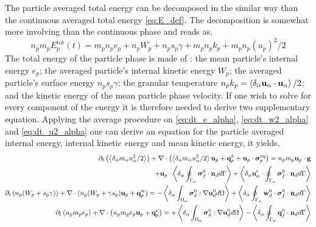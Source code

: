 The particle averaged total energy can be decomposed in the similar way than the continuous averaged total energy \ref{eq:E_def}. 
The decomposition is somewhat more involving than the continuous phase and reads as, 
\begin{equation*}
    n_p m_p E_p^\text{tot}(t) 
    = m_p n_p e_p 
    + n_p W_p
    + n_p s_p \gamma
    + m_p n_p k_p
    + m_p n_p (u_p)^2/2
    \label{eq:E_p_def}
\end{equation*}
The total energy of the particle phase is made of :
the mean particle's internal energy $e_p$; 
the averaged particle's internal kinetic energy $W_p$;
the averaged particle's surface energy $n_p s_p \gamma$;
the granular temperature $n_p k_p =\left<\delta_\alpha \textbf{u}_\alpha \cdot\textbf{u}_\alpha\right>/2$;
and the kinetic energy of the mean particle phase velocity. 
If one wish to solve for every component of the energy it is therefore needed to derive two supplementary equation. 
Applying the average procedure on \ref{eq:dt_e_alpha}, \ref{eq:dt_w2_alpha} and \ref{eq:dt_u2_alpha} one can derive an equation for the particle averaged internal energy, internal kinetic energy and mean kinetic energy, it yields, 
\begin{align}
    \label{eq:dt_hybrid_u2p}
    \partial_t \left(\left<\delta_\alpha m_\alpha u_\alpha^2/2\right>\right)
    + \mathbf{\nabla}\cdot \left(\left<\delta_\alpha m_\alpha u_\alpha^2/2\right> \textbf{u}_p 
    + \textbf{q}^k_p
    + \textbf{u}_p \cdot \bm{\sigma}_p^\text{eq}
    \right)
    = 
    n_p m_p \textbf{u}_p \cdot
    \textbf{g}\nonumber\\  
    + \textbf{u}_p\cdot\left<\delta_\alpha \oint_{\Gamma_\alpha} {\bm{\sigma}_f^0 \cdot \textbf{n}_d} d\Gamma\right>
    + \left<\delta_\alpha \textbf{u}_\alpha'\cdot\oint_{\Gamma_\alpha} \bm{\sigma}_f^0 \cdot \textbf{n}_d d\Gamma\right>
    \\
    \label{eq:dt_hybrid_Wp}
    \partial_t \left(n_p (W_p + s_p\gamma)\right)
    + \mathbf{\nabla}\cdot 
    (n_p (W_p + \gamma s_p)
    \textbf{u}_p 
    +  \textbf{q}_p^\text{w}
    )
    = 
    - \left<\delta_\alpha \int_{\Omega_\alpha} {\bm{\sigma}_d^0 : \mathbf{\nabla}\textbf{u}_d^0} d\Omega\right>
    + \left<\delta_\alpha \oint_{\Gamma_\alpha} {\textbf{w}_d^0 \cdot \bm{\sigma}_f^0 \cdot  \textbf{n}_d} d\Gamma\right>
    \\
    \partial_t \left(n_p m_p e_p\right)
    + \mathbf{\nabla}\cdot \left(n_p
    m_p e_p \textbf{u}_p 
    +  \textbf{q}_p^\text{e}
    \right)
    = 
    + \left<\delta_\alpha \int_{\Omega_\alpha} {\bm{\sigma}_d^0 : \mathbf{\nabla}\textbf{u}_d^0} d\Omega\right>
    - \left<\delta_\alpha \oint_{\Gamma_\alpha} {\textbf{q}_f^0\cdot \textbf{n}_d} d\Gamma\right>
    \label{eq:dt_hybrid_ep}
\end{align}
